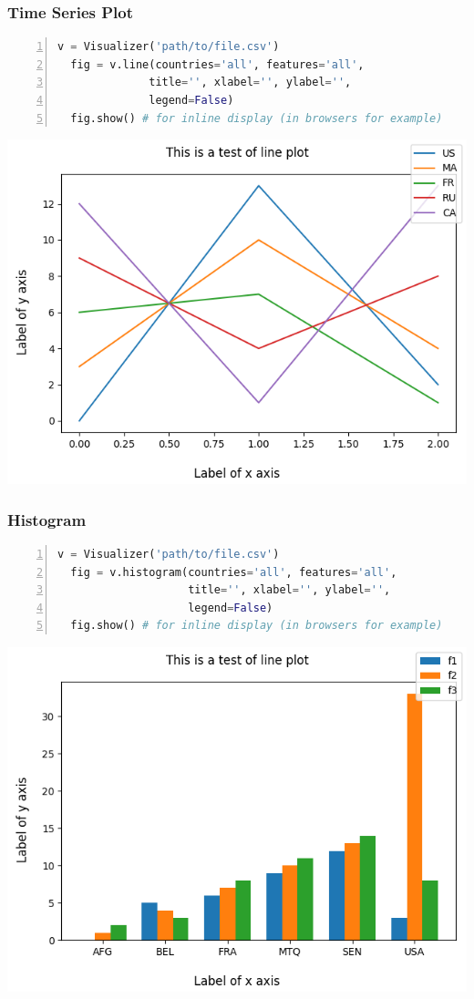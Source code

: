 \begin{frame}
  \frametitle{Time Series Plot}

  \begin{lstlisting}[language=Python,numbers=left]
  v = Visualizer('path/to/file.csv')
  fig = v.line(countries='all', features='all',
              title='', xlabel='', ylabel='', 
              legend=False)
  fig.show() # for inline display (in browsers for example)
  \end{lstlisting}
  
  \includegraphics[scale=0.4]{../inc/graphics/line.png}

\end{frame}

\begin{frame}
  \frametitle{Histogram}

  \begin{lstlisting}[language=Python,numbers=left]
  v = Visualizer('path/to/file.csv')
  fig = v.histogram(countries='all', features='all',
                    title='', xlabel='', ylabel='', 
                    legend=False)
  fig.show() # for inline display (in browsers for example)
  \end{lstlisting}
  
  \includegraphics[scale=0.4]{../inc/graphics/histogram.png}

\end{frame}
